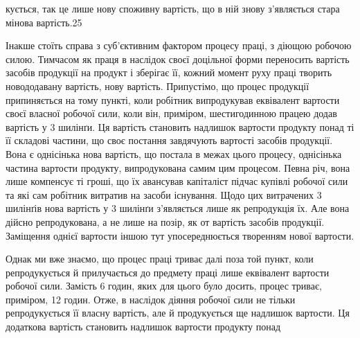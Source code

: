 кується, так це лише нову споживну вартість, що в ній знову
з’являється стара мінова вартість.25

Інакше стоїть справа з суб’єктивним фактором процесу праці,
з діющою робочою силою. Тимчасом як праця в наслідок своєї
доцільної форми переносить вартість засобів продукції на продукт
і зберігає її, кожний момент руху праці творить новододавану вартість,
нову вартість. Припустімо, що процес продукції припиняється
на тому пункті, коли робітник випродукував еквівалент
вартости своєї власної робочої сили, коли він, приміром, шестигодинною
працею додав вартість у 3 шилінґи. Ця вартість становить
надлишок вартости продукту понад ті її складові частини,
що своє постання завдячують вартості засобів продукції. Вона є
однісінька нова вартість, що постала в межах цього процесу,
однісінька частина вартости продукту, випродукована самим цим
процесом. Певна річ, вона лише компенсує ті гроші, що їх авансував
капіталіст підчас купівлі робочої сили та які сам робітник
витратив на засоби існування. Щодо цих витрачених 3 шилінґів
нова вартість у 3 шилінґи з’являється лише як репродукція їх.
Але вона дійсно репродукована, а не лише на позір, як от вартість
засобів продукції. Заміщення однієї вартости іншою тут упосереднюється
творенням нової вартости.

Однак ми вже знаємо, що процес праці триває далі поза той
пункт, коли репродукується й прилучається до предмету праці
лише еквівалент вартости робочої сили. Замість 6 годин, яких
для цього було досить, процес триває, приміром, 12 годин. Отже,
в наслідок діяння робочої сили не тільки репродукується її власну
вартість, але й продукується ще надлишок вартости. Ця додаткова
вартість становить надлишок вартости продукту понад

